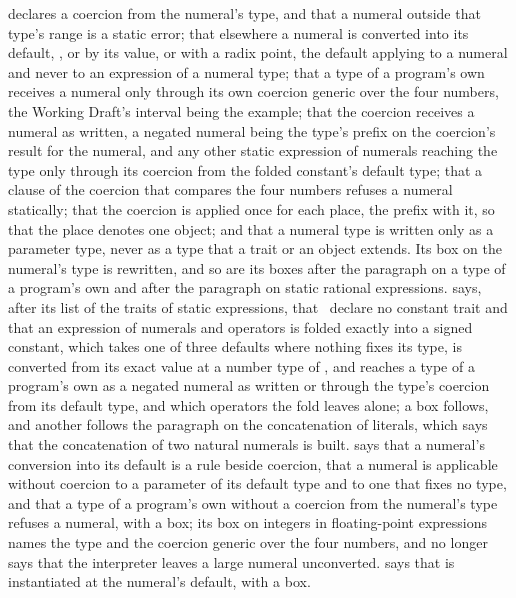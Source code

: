 \begin{description}
declares a coercion from the numeral's type, and that a numeral outside that
type's range is a static error; that elsewhere a numeral is converted into its
default, ,  or  by its value,
or  with a radix point, the default applying to a numeral and
never to an expression of a numeral type; that a type of a program's own
receives a numeral only through its own coercion generic over the four numbers,
the Working Draft's interval being the example; that the coercion receives a
numeral as written, a negated numeral being the type's prefix \EXP{-} on the
coercion's result for the numeral, and any other static expression of numerals
reaching the type only through its coercion from the folded constant's default
type; that a  clause of the coercion that compares the four numbers
refuses a numeral statically; that the coercion is applied once for each place,
the prefix \EXP{-} with it, so that the place denotes one object; and that a
numeral type is written only as a parameter type, never as a type that a trait
or an object extends.
Its box on the numeral's type is rewritten, and so are its boxes after the
paragraph on a type of a program's own and after the paragraph on static
rational expressions.
 says, after its list of the traits of static expressions,
that \library\ declare no constant trait and that an expression of numerals and
operators is folded exactly into a signed constant, which takes one of three
defaults where nothing fixes its type, is converted from its exact value at a
number type of \library, and reaches a type of a program's own as a negated
numeral as written or through the type's coercion from its default type, and
which operators the fold leaves alone; a box follows, and another follows the
paragraph on the concatenation of literals, which says that the concatenation of
two natural numerals is built.
 says that a numeral's conversion into its default is a rule
beside coercion, that a numeral is applicable without coercion to a parameter of
its default type and to one that fixes no type, and that a type of a program's
own without a coercion from the numeral's type refuses a numeral, with a box;
its box on integers in floating-point expressions names the type
 and the coercion generic
over the four numbers, and no longer says that the interpreter leaves a large
numeral unconverted.
 says that  is instantiated at the
numeral's default, with a box.

\end{description}
